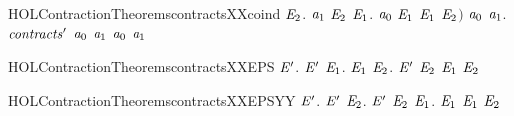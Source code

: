 \begin{SaveVerbatim}{HOLContractionTheoremscontractsXXcoind}
        \HOLSymConst{\HOLTokenForall{}}\ensuremath{\HOLBoundVar{E}\sb{\mathrm{2}}}. \ensuremath{\HOLBoundVar{a}\sb{\mathrm{1}}} \HOLTokenTransBegin\HOLConst{\ensuremath{\tau}}\HOLTokenTransEnd \ensuremath{\HOLBoundVar{E}\sb{\mathrm{2}}} \HOLSymConst{\HOLTokenImp{}} \HOLSymConst{\HOLTokenExists{}}\ensuremath{\HOLBoundVar{E}\sb{\mathrm{1}}}.  \ensuremath{\HOLBoundVar{a}\sb{\mathrm{0}}} \ensuremath{\HOLBoundVar{E}\sb{\mathrm{1}}} \HOLSymConst{\HOLTokenConj{}}  \ensuremath{\HOLBoundVar{E}\sb{\mathrm{1}}} \ensuremath{\HOLBoundVar{E}\sb{\mathrm{2}}}\ensuremath{)} \HOLSymConst{\HOLTokenImp{}}
     \HOLSymConst{\HOLTokenForall{}}\ensuremath{\HOLBoundVar{a}\sb{\mathrm{0}}} \ensuremath{\HOLBoundVar{a}\sb{\mathrm{1}}}. \ensuremath{\HOLBoundVar{contracts}\sp{\prime{}}} \ensuremath{\HOLBoundVar{a}\sb{\mathrm{0}}} \ensuremath{\HOLBoundVar{a}\sb{\mathrm{1}}} \HOLSymConst{\HOLTokenImp{}} \ensuremath{\HOLBoundVar{a}\sb{\mathrm{0}}}  \ensuremath{\HOLBoundVar{a}\sb{\mathrm{1}}}
\end{SaveVerbatim}
\newcommand{\HOLContractionTheoremscontractsXXcoind}{\UseVerbatim{HOLContractionTheoremscontractsXXcoind}}
\begin{SaveVerbatim}{HOLContractionTheoremscontractsXXEPS}
\HOLTokenTurnstile{} \HOLSymConst{\HOLTokenForall{}} \ensuremath{\HOLBoundVar{E}\sp{\prime{}}}.
       \ensuremath{\HOLBoundVar{E}\sp{\prime{}}} \HOLSymConst{\HOLTokenImp{}}
     \HOLSymConst{\HOLTokenForall{}}\ensuremath{\HOLBoundVar{E}\sb{\mathrm{1}}}.   \ensuremath{\HOLBoundVar{E}\sb{\mathrm{1}}} \HOLSymConst{\HOLTokenImp{}} \HOLSymConst{\HOLTokenExists{}}\ensuremath{\HOLBoundVar{E}\sb{\mathrm{2}}}.  \ensuremath{\HOLBoundVar{E}\sp{\prime{}}} \ensuremath{\HOLBoundVar{E}\sb{\mathrm{2}}} \HOLSymConst{\HOLTokenConj{}} \ensuremath{\HOLBoundVar{E}\sb{\mathrm{1}}}  \ensuremath{\HOLBoundVar{E}\sb{\mathrm{2}}}
\end{SaveVerbatim}
\newcommand{\HOLContractionTheoremscontractsXXEPS}{\UseVerbatim{HOLContractionTheoremscontractsXXEPS}}
\begin{SaveVerbatim}{HOLContractionTheoremscontractsXXEPSYY}
\HOLTokenTurnstile{} \HOLSymConst{\HOLTokenForall{}} \ensuremath{\HOLBoundVar{E}\sp{\prime{}}}.
       \ensuremath{\HOLBoundVar{E}\sp{\prime{}}} \HOLSymConst{\HOLTokenImp{}}
     \HOLSymConst{\HOLTokenForall{}}\ensuremath{\HOLBoundVar{E}\sb{\mathrm{2}}}.  \ensuremath{\HOLBoundVar{E}\sp{\prime{}}} \ensuremath{\HOLBoundVar{E}\sb{\mathrm{2}}} \HOLSymConst{\HOLTokenImp{}} \HOLSymConst{\HOLTokenExists{}}\ensuremath{\HOLBoundVar{E}\sb{\mathrm{1}}}.   \ensuremath{\HOLBoundVar{E}\sb{\mathrm{1}}} \HOLSymConst{\HOLTokenConj{}}  \ensuremath{\HOLBoundVar{E}\sb{\mathrm{1}}} \ensuremath{\HOLBoundVar{E}\sb{\mathrm{2}}}
\end{SaveVerbatim}
